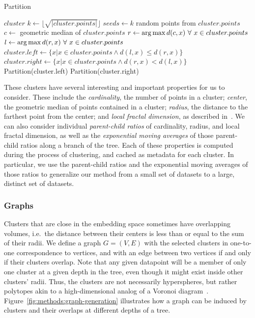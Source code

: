 \begin{algorithm} %
\caption{Partition} %
\label{alg:clam-partition} %
\begin{algorithmic}[1] %
    \REQUIRE $cluster$
    \STATE $k \leftarrow \lfloor \sqrt{|cluster.points|} \rfloor$
    \STATE $seeds \leftarrow k$ random points from $cluster.points$
    \STATE $c \leftarrow$ geometric median of $cluster.points$
    \STATE $r \leftarrow \operatorname*{arg\,max} d(c,x) \ \forall \ x \in cluster.points$
    \STATE $l \leftarrow \operatorname*{arg\,max} d(r,x) \ \forall \ x \in cluster.points$
    \STATE $cluster.left \leftarrow \{x | x \in cluster.points \land d(l,x) \le d(r,x)\}$
    \STATE $cluster.right \leftarrow \{x | x \in cluster.points \land d(r,x) < d(l,x)\}$
        \STATE Partition(cluster.left)
    \ENDIF
        \STATE Partition(cluster.right)
    \ENDIF
\end{algorithmic}
\end{algorithm}

These clusters have several interesting and important properties for us to consider.
These include the \textit{cardinality}, the number of points in a cluster;
\textit{center}, the geometric median of points contained in a cluster;
\textit{radius}, the distance to the farthest point from the center;
and \textit{local fractal dimension}, as described in~\cite{ishaq2019clustered}.
We can also consider individual \textit{parent-child ratios} of cardinality, radius, and local fractal dimension, as well as the \textit{exponential moving averages} of those parent-child ratios along a branch of the tree.
Each of these properties is computed during the process of clustering, and cached as metadata for each cluster.
In particular, we use the parent-child ratios and the exponential moving averages of those ratios to generalize our method from a small set of datasets to a large, distinct set of datasets.

\subsubsection{Graphs}
Clusters that are close in the embedding space sometimes have overlapping volumes, i.e.\ the distance between their centers is less than or equal to the sum of their radii.
We define a graph $G=(V,E)$ with the selected clusters in one-to-one correspondence to vertices, and with an edge between two vertices if and only if their clusters overlap.
Note that any given datapoint will be a member of only one cluster at a given depth in the tree, even though it might exist inside other clusters' radii.
Thus, the clusters are not necessarily hyperspheres, but rather polytopes akin to a high-dimensional analog of a Voronoi diagram~\cite{voronoi1908nouvelles}.
Figure~\ref{fig:methods:graph-generation} illustrates how a graph can be induced by clusters and their overlaps at different depths of a tree.

